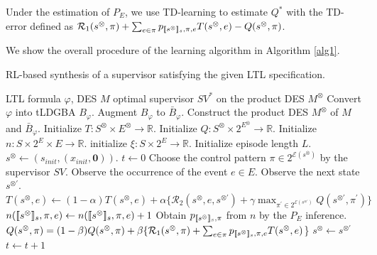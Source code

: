 Under the estimation of $P_E$, we use TD-learning to estimate $Q^{\ast}$ with the TD-error defined as $\mathcal{R}_1(s^{\otimes},\pi) + \sum_{e \in \pi} p_{[\![s^{\otimes}]\!]_s,\pi,e} T(s^{\otimes},e) - Q(s^{\otimes},\pi)$.

We show the overall procedure of the learning algorithm in Algorithm \ref{alg1}.

\begin{algorithm}[H]
 \caption{RL-based synthesis of a supervisor satisfying the given LTL specification.}
 \begin{algorithmic}[1]
 \renewcommand{\algorithmicrequire}{\textbf{Input:}}
 \renewcommand{\algorithmicensure}{\textbf{Output:}}
 \REQUIRE LTL formula $\varphi$, DES $M$
 \ENSURE  optimal supervisor $SV^{\ast}$ on the product DES $M^{\otimes}$
  \STATE Convert $\varphi$ into tLDGBA $B_{\varphi}$.
  \STATE Augment $B_{\varphi}$ to $\bar{B}_{\varphi}$.
  \STATE Construct the product DES $M^{\otimes}$ of $M$ and $\bar{B}_{\varphi}$.
  \STATE Initialize $T:S^{\otimes} \times E^{\otimes} \rightarrow \mathbb{R}$.
  \STATE Initialize $Q:S^{\otimes} \times 2^{E^{\otimes}} \rightarrow \mathbb{R}$.
  \STATE Initialize $n:S \times 2^{E} \times E \rightarrow \mathbb{R}$.
  \STATE initialize $\xi:S \times 2^{E} \rightarrow \mathbb{R}$.
  \STATE Initialize episode length $L$.
  \STATE $s^{\otimes} \leftarrow (s_{init},(x_{init},\bm{0}))$.
  \STATE $t \leftarrow 0$
  \STATE Choose the control pattern $\pi \in 2^{\mathcal{E}(s^{\otimes})}$ by the supervisor $SV$.
  \STATE Observe the occurrence of the event $e \in E$.
  \STATE Observe the next state $s^{\otimes \prime}$.
  \STATE $T(s^{\otimes},e) \leftarrow (1-\alpha)T(s^{\otimes},e) + \alpha \{\mathcal{R}_2(s^{\otimes},e,s^{\otimes \prime}) + \gamma \max_{\pi^{\prime} \in 2^{\mathcal{E}(s^{\otimes \prime})}}Q(s^{\otimes \prime},\pi^{\prime})\}$
  \STATE $n([\![s^{\otimes}]\!]_s, \pi, e) \leftarrow n([\![s^{\otimes}]\!]_s, \pi, e) + 1$
  \STATE Obtain $p_{[\![s^{\otimes}]\!]_s,\pi}$ from $n$ by the $P_E$ inference.
  \STATE $Q(s^{\otimes},\pi) = (1-\beta)Q(s^{\otimes},\pi) + \beta \{\mathcal{R}_1(s^{\otimes},\pi) + \sum_{e \in \pi} p_{[\![s^{\otimes}]\!]_s,\pi,e} T(s^{\otimes},e)$\}
  \STATE $s^{\otimes} \leftarrow s^{\otimes \prime}$
  \STATE $t \leftarrow t + 1$
  \ENDWHILE
  \ENDWHILE
 \end{algorithmic}
 \label{alg1}
 \end{algorithm}

